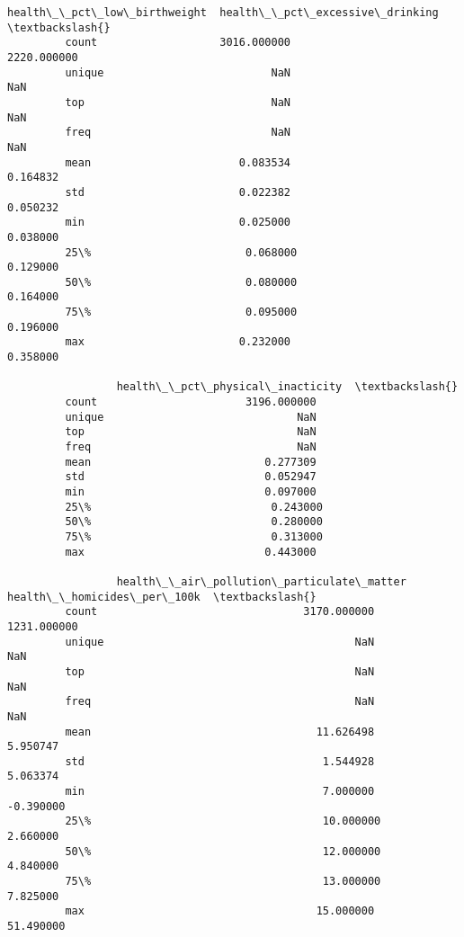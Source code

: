 \documentclass[11pt]{article}
\begin{document}
\begin{Verbatim}[commandchars=\\\{\}]
                 health\_\_pct\_low\_birthweight  health\_\_pct\_excessive\_drinking  \textbackslash{}
         count                   3016.000000                     2220.000000   
         unique                          NaN                             NaN   
         top                             NaN                             NaN   
         freq                            NaN                             NaN   
         mean                       0.083534                        0.164832   
         std                        0.022382                        0.050232   
         min                        0.025000                        0.038000   
         25\%                        0.068000                        0.129000   
         50\%                        0.080000                        0.164000   
         75\%                        0.095000                        0.196000   
         max                        0.232000                        0.358000   
         
                 health\_\_pct\_physical\_inacticity  \textbackslash{}
         count                       3196.000000   
         unique                              NaN   
         top                                 NaN   
         freq                                NaN   
         mean                           0.277309   
         std                            0.052947   
         min                            0.097000   
         25\%                            0.243000   
         50\%                            0.280000   
         75\%                            0.313000   
         max                            0.443000   
         
                 health\_\_air\_pollution\_particulate\_matter  health\_\_homicides\_per\_100k  \textbackslash{}
         count                                3170.000000                 1231.000000   
         unique                                       NaN                         NaN   
         top                                          NaN                         NaN   
         freq                                         NaN                         NaN   
         mean                                   11.626498                    5.950747   
         std                                     1.544928                    5.063374   
         min                                     7.000000                   -0.390000   
         25\%                                    10.000000                    2.660000   
         50\%                                    12.000000                    4.840000   
         75\%                                    13.000000                    7.825000   
         max                                    15.000000                   51.490000   
         

\end{Verbatim}
\end{document}
